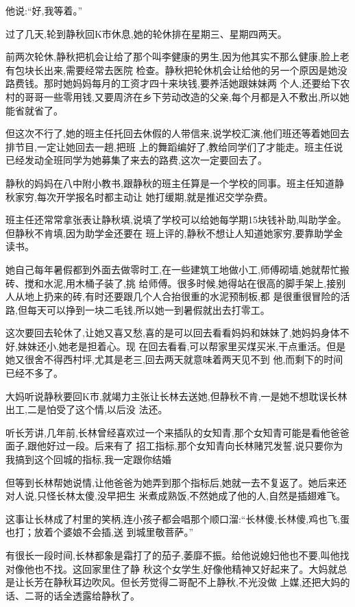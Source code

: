 ﻿\documentclass[12pt]{article}
\begin{document}
他说:``好,我等着。''
 
 
过了几天,轮到静秋回K市休息,她的轮休排在星期三、星期四两天。

前两次轮休,静秋把机会让给了那个叫李健康的男生,因为他其实不那么健康,脸上老有包块长出来,需要经常去医院
检查。静秋把轮休机会让给他的另一个原因是她没路费钱。那时她妈妈每月的工资才四十来块钱,要养活她跟妹妹两
个人,还要给下农村的哥哥一些零用钱,又要周济在乡下劳动改造的父亲,每个月都是入不敷出,所以她能省就省了。

但这次不行了,她的班主任托回去休假的人带信来,说学校汇演,他们班还等着她回去排节目,一定让她回去一趟,把班
上的舞蹈编好了,教给同学们了才能走。班主任说已经发动全班同学为她募集了来去的路费,这次一定要回去了。

静秋的妈妈在八中附小教书,跟静秋的班主任算是一个学校的同事。班主任知道静秋家穷,每次开学报名时都主动让
她打缓期,就是推迟交学杂费。

班主任还常常拿张表让静秋填,说填了学校可以给她每学期15块钱补助,叫助学金。但静秋不肯填,因为助学金还要在
班上评的,静秋不想让人知道她家穷,要靠助学金读书。

她自己每年暑假都到外面去做零时工,在一些建筑工地做小工,师傅砌墙,她就帮忙搬砖、搅和水泥,用木桶子装了,挑
给师傅。很多时候,她得站在很高的脚手架上,接别人从地上扔来的砖,有时还要跟几个人合抬很重的水泥预制板,都
是很重很冒险的活路,但每天可以挣到一块二毛钱,所以她一到暑假就出去打零工。

这次要回去轮休了,让她又喜又愁,喜的是可以回去看看妈妈和妹妹了,她妈妈身体不好,妹妹还小,她老是担着心。现
在回去看看,可以帮家里买煤买米,干点重活。但是她又很舍不得西村坪,尤其是老三,回去两天就意味着两天见不到
他,而剩下的时间已经不多了。


大妈听说静秋要回K市,就竭力主张让长林去送她,但静秋不肯,一是她不想耽误长林出工,二是怕受了这个情,以后没
法还。

听长芳讲,几年前,长林曾经喜欢过一个来插队的女知青,那个女知青可能是看他爸爸面子,跟他好过一段。后来有了
招工指标,那个女知青向长林赌咒发誓,说只要你为我搞到这个回城的指标,我一定跟你结婚

但等到长林帮她说情,让他爸爸为她弄到那个指标后,她就一去不复返了。她后来还对人说,只怪长林太傻,没早把生
米煮成熟饭,不然她成了他的人,自然是插翅难飞。

这事让长林成了村里的笑柄,连小孩子都会唱那个顺口溜:``长林傻,长林傻,鸡也飞,蛋也打；放着个婆娘不会插,送
到城里敬菩萨。''

有很长一段时间,长林都象是霜打了的茄子,萎靡不振。给他说媳妇他也不要,叫他找对像他也不找。这回家里住了静
秋这个女学生,好像他精神又好起来了。大妈就总是让长芳在静秋耳边吹风。但长芳觉得二哥配不上静秋,不光没做
上媒,还把大妈的话、二哥的话全透露给静秋了。
\end{document}
